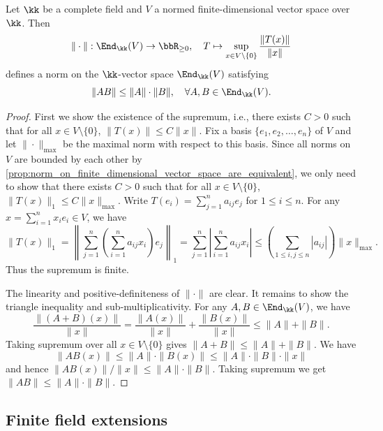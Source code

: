     \begin{lemma}\label{prop:operator_norm_on_M_n_k_with_k_complete}
        Let \(\kk\) be a complete field and \(V\) a normed finite-dimensional vector space over \(\kk\).
        Then 
        \[ \|\cdot\| : \End_{\kk}(V) \to \bbR_{\geq 0}, \quad T \mapsto \sup_{x \in V \setminus \{0\}} \frac{\|T(x)\|}{\|x\|} \]
        defines a norm on the \(\kk\)-vector space \(\End_{\kk}(V)\) satisfying
        \[ \|AB\| \leq \|A\| \cdot \|B\|, \quad \forall A, B \in \End_{\kk}(V). \]
    \end{lemma}
    \begin{proof}
        First we show the existence of the supremum, i.e., there exists \(C > 0\) such that for all \(x \in V \setminus \{0\}\), \(\|T(x)\| \leq C \|x\|\).
        Fix a basis \(\{e_1, e_2, \ldots, e_n\}\) of \(V\) and let \(\|\cdot\|_{\max}\) be the maximal norm with respect to this basis.
        Since all norms on \(V\) are bounded by each other by \cref{prop:norm_on_finite_dimensional_vector_space_are_equivalent}, we only need to show that there exists \(C > 0\) such that for all \(x \in V \setminus \{0\}\), \(\|T(x)\|_{1} \leq C \|x\|_{\max}\).
        Write \(T(e_i) = \sum_{j=1}^n a_{ij} e_j\) for \(1 \leq i \leq n\).
        For any \(x = \sum_{i=1}^n x_i e_i \in V\), we have
        \[ \|T(x)\|_1 = \left\|\sum_{j=1}^n \left(\sum_{i=1}^n a_{ij} x_i\right) e_j \right\|_1 = \sum_{j=1}^n \left|\sum_{i=1}^n a_{ij} x_i\right| \leq \left(\sum_{1 \leq i, j \leq n} |a_{ij}|\right) \|x\|_{\max}. \]
        Thus the supremum is finite.

        The linearity and positive-definiteness of \(\|\cdot\|\) are clear.
        It remains to show the triangle inequality and sub-multiplicativity.
        For any \(A, B \in \End_{\kk}(V)\), we have
        \[ \frac{\|(A + B)(x)\|}{\|x\|} = \frac{\|A(x)\|}{\|x\|} + \frac{\|B(x)\|}{\|x\|} \leq \|A\| + \|B\|. \]
        Taking supremum over all \(x \in V \setminus \{0\}\) gives \(\|A + B\| \leq \|A\| + \|B\|\).
        We have 
        \[ \|AB(x)\| \leq \|A\| \cdot \|B(x)\| \leq \|A\| \cdot \|B\| \cdot \|x\| \]
        and hence \(\|AB(x)\|/\|x\| \leq \|A\| \cdot \|B\|\).
        Taking supremum we get \(\|AB\| \leq \|A\| \cdot \|B\|\). 
    \end{proof}

\subsection{Finite field extensions}

